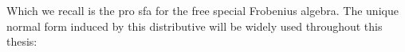 %
%
%
%
Which we recall is the  pro {\sf sfa} for the free  special  Frobenius algebra.
The unique normal form induced by this distributive will be widely used throughout this thesis:
